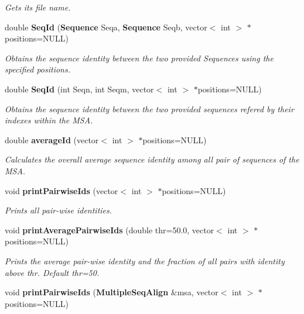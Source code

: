 \begin{CompactItemize}
\begin{CompactList}\small\item\em Gets its file name. \item\end{CompactList}\item 
double {\bf Seq\-Id} ({\bf Sequence} Seqa, {\bf Sequence} Seqb, vector$<$ int $>$ $\ast$positions=NULL)\label{classMultipleSeqAlign_a21}

\begin{CompactList}\small\item\em Obtains the sequence identity between the two provided Sequences using the specified positions. \item\end{CompactList}\item 
double {\bf Seq\-Id} (int Seqn, int Seqm, vector$<$ int $>$ $\ast$positions=NULL)\label{classMultipleSeqAlign_a22}

\begin{CompactList}\small\item\em Obtains the sequence identity between the two provided sequences refered by their indexes within the MSA. \item\end{CompactList}\item 
double {\bf average\-Id} (vector$<$ int $>$ $\ast$positions=NULL)\label{classMultipleSeqAlign_a23}

\begin{CompactList}\small\item\em Calculates the overall average sequence identity among all pair of sequences of the MSA. \item\end{CompactList}\item 
void {\bf print\-Pairwise\-Ids} (vector$<$ int $>$ $\ast$positions=NULL)\label{classMultipleSeqAlign_a24}

\begin{CompactList}\small\item\em Prints all pair-wise identities. \item\end{CompactList}\item 
void {\bf print\-Average\-Pairwise\-Ids} (double thr=50.0, vector$<$ int $>$ $\ast$positions=NULL)
\begin{CompactList}\small\item\em Prints the average pair-wise identity and the fraction of all pairs with identity above thr. Default thr=50. \item\end{CompactList}\item 
void {\bf print\-Pairwise\-Ids} ({\bf Multiple\-Seq\-Align} \&msa, vector$<$ int $>$ $\ast$positions=NULL)\label{classMultipleSeqAlign_a26}


\end{CompactItemize}
